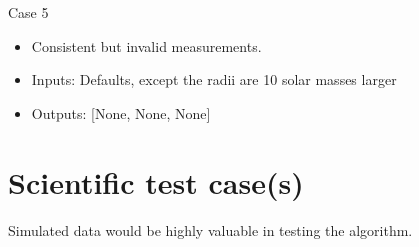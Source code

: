 \documentclass[a4paper, oneside, 11pt, article, english]{memoir}
\begin{document}
Case 5
\begin{itemize}
    \firmlist
    \item Consistent but invalid measurements. 
     \item Inputs: Defaults, except the radii are 10 solar masses larger 
     \item Outputs: [None, None, None]
\end{itemize}

\section{Scientific test case(s)}
\label{sec:test-science}

Simulated data would be highly valuable in testing the algorithm. 



\end{document}
